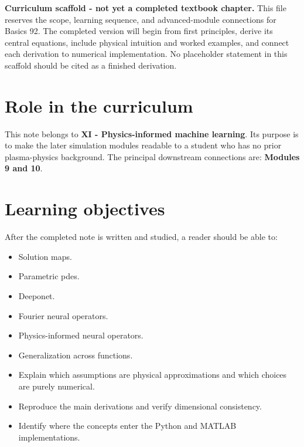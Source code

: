 \documentclass[11pt]{article}
\begin{document}

\begin{overviewbox}
\textbf{Curriculum scaffold - not yet a completed textbook chapter.} This file reserves the scope, learning sequence, and advanced-module connections for Basics 92. The completed version will begin from first principles, derive its central equations, include physical intuition and worked examples, and connect each derivation to numerical implementation. No placeholder statement in this scaffold should be cited as a finished derivation.
\end{overviewbox}

\ProjectTOC

\section{Role in the curriculum}
This note belongs to \textbf{XI - Physics-informed machine learning}. Its purpose is to make the later simulation modules readable to a student who has no prior plasma-physics background. The principal downstream connections are: \textbf{Modules 9 and 10}.

\section{Learning objectives}
After the completed note is written and studied, a reader should be able to:
\begin{itemize}[leftmargin=1.6em]
\item Solution maps.
\item Parametric pdes.
\item Deeponet.
\item Fourier neural operators.
\item Physics-informed neural operators.
\item Generalization across functions.
\item Explain which assumptions are physical approximations and which choices are purely numerical.
\item Reproduce the main derivations and verify dimensional consistency.
\item Identify where the concepts enter the Python and MATLAB implementations.
\end{itemize}
\end{document}
